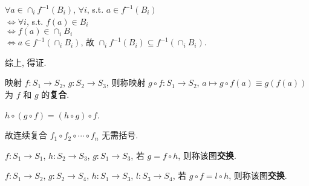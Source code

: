 \documentclass{note}
\begin{document}
\begin{itemize}
\begin{pf}
        $\forall a\in\cap_if^{-1}(B_i)$, $\forall i$, s.t. $a\in f^{-1}(B_i)$\\
        $\Longleftrightarrow\forall i$, s.t. $f(a)\in B_i$\\
        $\Longleftrightarrow f(a)\in\cap_iB_i$\\
        $\Longleftrightarrow a\in f^{-1}(\cap_iB_i)$, 故 $\cap_if^{-1}(B_i)\subseteq f^{-1}(\cap_iB_i)$.

        综上, 得证.
    \end{pf}
\end{itemize}

\begin{df}[映射的复合]
    映射 $f:S_1\rightarrow S_2$, $g:S_2\rightarrow S_3$, 则称映射 $g\circ f:S_1\rightarrow S_2$, $a\mapsto g\circ f(a)\equiv g(f(a))$ 为 $f$ 和 $g$ 的\textbf{复合}.
\end{df}

\begin{thm}[映射复合的结合律]
    $h\circ(g\circ f)=(h\circ g)\circ f$.
\end{thm}

故连续复合 $f_1\circ f_2\circ\cdots\circ f_n$ 无需括号.

\begin{df}[交换图]
    $f: S_1\rightarrow S_1$, $h:S_2\rightarrow S_3$, $g:S_1\rightarrow S_3$, 若 $g=f\circ h$, 则称该图\textbf{交换}.
    \begin{center}
    \end{center}

    $f:S_1\rightarrow S_2$, $g:S_2\rightarrow S_4$, $h:S_1\rightarrow S_3$, $l:S_3\rightarrow S_4$, 若 $g\circ f=l\circ h$, 则称该图\textbf{交换}.
    \begin{center}
    \end{center}
\end{df}
\end{document}
